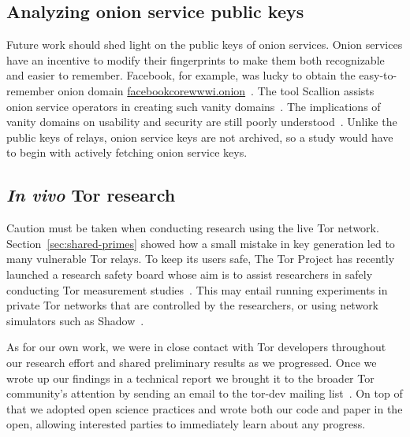 \subsection{Analyzing onion service public keys}
Future work should shed light on the public keys of onion services.  Onion
services have an incentive to modify their fingerprints to make them both
recognizable and easier to remember.  Facebook, for example, was lucky to
obtain the easy-to-remember onion domain
\url{facebookcorewwwi.onion}~\cite{facebook}.  The tool Scallion assists onion
service operators in creating such vanity domains~\cite{scallion}.  The
implications of vanity domains on usability and security are still poorly
understood~\cite{vanity-domains}.  Unlike the public keys of relays, onion
service keys are not archived, so a study would have to begin with actively
fetching onion service keys.

\subsection{\textit{In vivo} Tor research}
Caution must be taken when conducting research using the live Tor network.
Section~\ref{sec:shared-primes} showed how a small mistake in key generation led
to many vulnerable Tor relays.  To keep its users safe, The Tor Project has
recently launched a research safety board whose aim is to assist researchers in
safely conducting Tor measurement studies~\cite{safety-board}.  This may entail
running experiments in private Tor networks that are controlled by the
researchers, or using network simulators such as Shadow~\cite{Jansen2012a}.

As for our own work, we were in close contact with Tor developers throughout our
research effort and shared preliminary results as we progressed.  Once we wrote
up our findings in a technical report we brought it to the broader Tor
community's attention by sending an email to the tor-dev mailing
list~\cite{Roberts2017a}.  On top of that we adopted open science practices and
wrote both our code and paper in the open, allowing interested parties to
immediately learn about any progress.

